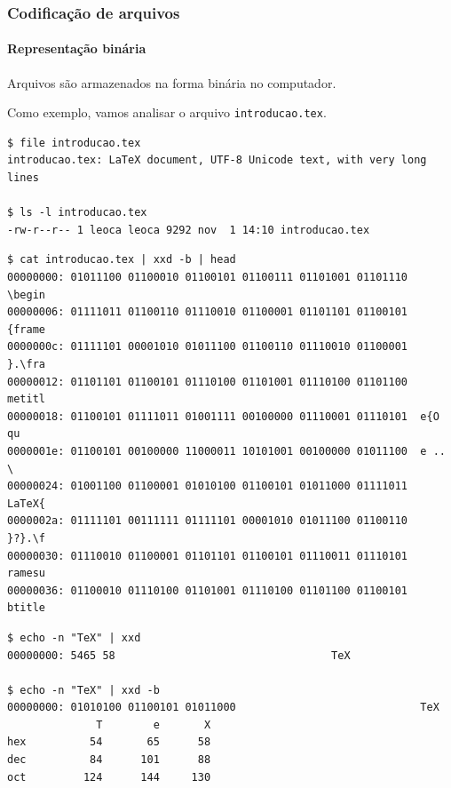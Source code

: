 \begin{frame}
\frametitle{Codificação de arquivos}
\framesubtitle{Representação binária}
Arquivos são armazenados na forma binária no computador. 

\vspace{3ex}
Como exemplo, vamos analisar o arquivo \texttt{introducao.tex}.

\begin{footnotesize}
\begin{verbatim}
$ file introducao.tex 
introducao.tex: LaTeX document, UTF-8 Unicode text, with very long lines

$ ls -l introducao.tex
-rw-r--r-- 1 leoca leoca 9292 nov  1 14:10 introducao.tex
\end{verbatim}
\end{footnotesize}

\framebreak
\begin{footnotesize}
\begin{verbatim}
$ cat introducao.tex | xxd -b | head
00000000: 01011100 01100010 01100101 01100111 01101001 01101110  \begin
00000006: 01111011 01100110 01110010 01100001 01101101 01100101  {frame
0000000c: 01111101 00001010 01011100 01100110 01110010 01100001  }.\fra
00000012: 01101101 01100101 01110100 01101001 01110100 01101100  metitl
00000018: 01100101 01111011 01001111 00100000 01110001 01110101  e{O qu
0000001e: 01100101 00100000 11000011 10101001 00100000 01011100  e .. \
00000024: 01001100 01100001 01010100 01100101 01011000 01111011  LaTeX{
0000002a: 01111101 00111111 01111101 00001010 01011100 01100110  }?}.\f
00000030: 01110010 01100001 01101101 01100101 01110011 01110101  ramesu
00000036: 01100010 01110100 01101001 01110100 01101100 01100101  btitle
\end{verbatim}
\end{footnotesize}

\begin{footnotesize}
\begin{verbatim}
$ echo -n "TeX" | xxd
00000000: 5465 58                                  TeX

$ echo -n "TeX" | xxd -b
00000000: 01010100 01100101 01011000                             TeX
              T        e       X
hex          54       65      58 
dec          84      101      88
oct         124      144     130
\end{verbatim}
\end{footnotesize}
\end{frame}

